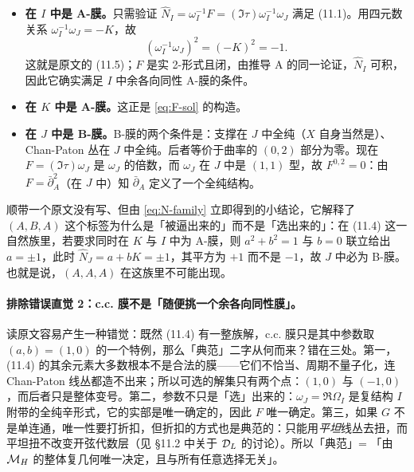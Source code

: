 \begin{itemize}
\item \textbf{在 \(I\) 中是 A-膜。}只需验证 \(\hat N_I=\omega_I^{-1}F=(\Im\tau)\omega_I^{-1}\omega_J\) 满足 (11.1)。用四元数关系 \(\omega_I^{-1}\omega_J=-K\)，故
\begin{equation}
(\omega_I^{-1}\omega_J)^2=(-K)^2=-1 .
\label{eq:ABCA-I}
\end{equation}
这就是原文的 (11.5)；\(F\) 是实 2-形式且闭，由推导 A 的同一论证，\(\hat N_I\) 可积，因此它确实满足 \(I\) 中余各向同性 A-膜的条件。\pA{}
\item \textbf{在 \(K\) 中是 A-膜。}这正是 \eqref{eq:F-sol} 的构造。
\item \textbf{在 \(J\) 中是 B-膜。}B-膜的两个条件是：支撑在 \(J\) 中全纯（\(X\) 自身当然是）、Chan-Paton 丛在 \(J\) 中全纯。后者等价于曲率的 \((0,2)\) 部分为零。现在 \(F=(\Im\tau)\omega_J\) 是 \(\omega_J\) 的倍数，而 \(\omega_J\) 在 \(J\) 中是 \((1,1)\) 型，故 \(F^{0,2}=0\)：由 \(F=\bar\partial_A^2\)（在 \(J\) 中）知 \(\bar\partial_A\) 定义了一个全纯结构。\pA{}
\end{itemize}

顺带一个原文没有写、但由 \eqref{eq:N-family} 立即得到的小结论，它解释了 \((A,B,A)\) 这个标签为什么是「被逼出来的」而不是「选出来的」：在 (11.4) 这一自然族里，若要求同时在 \(K\) 与 \(I\) 中为 A-膜，则 \(a^2+b^2=1\) 与 \(b=0\) 联立给出 \(a=\pm1\)，此时 \(\hat N_J=a+bK=\pm1\)，其平方为 \(+1\) 而不是 \(-1\)，故 \(J\) 中必为 B-膜。也就是说，\((A,A,A)\) 在这族里不可能出现。\pC{}


\paragraph{排除错误直觉 2：c.c. 膜不是「随便挑一个余各向同性膜」。}读原文容易产生一种错觉：既然 (11.4) 有一整族解，c.c. 膜只是其中参数取 \((a,b)=(1,0)\) 的一个特例，那么「典范」二字从何而来？错在三处。第一，(11.4) 的其余元素大多数根本不是合法的膜——它们不恰当、周期不量子化，连 Chan-Paton 线丛都造不出来；所以可选的解集只有两个点：\((1,0)\) 与 \((-1,0)\)，而后者只是整体变号。第二，参数不只是「选」出来的：\(\omega_J=\Re\Omega_I\) 是复结构 \(I\) 附带的全纯辛形式，它的实部是唯一确定的，因此 \(F\) 唯一确定。第三，如果 \(G\) 不是单连通，唯一性要打折扣，但折扣的方式也是典范的：只能用\emph{平坦}线丛去扭，而平坦扭不改变开弦代数层（见 \S11.2 中关于 \(\mathcal{D}_L\) 的讨论）。所以「典范」= 「由 \(\mathcal{M}_H\) 的整体复几何唯一决定，且与所有任意选择无关」。\pA{}\pC{}

